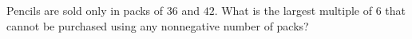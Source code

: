 Pencils are sold only in packs of $36$ and $42$. What is the largest multiple of $6$ that cannot be purchased using any nonnegative number of packs?
